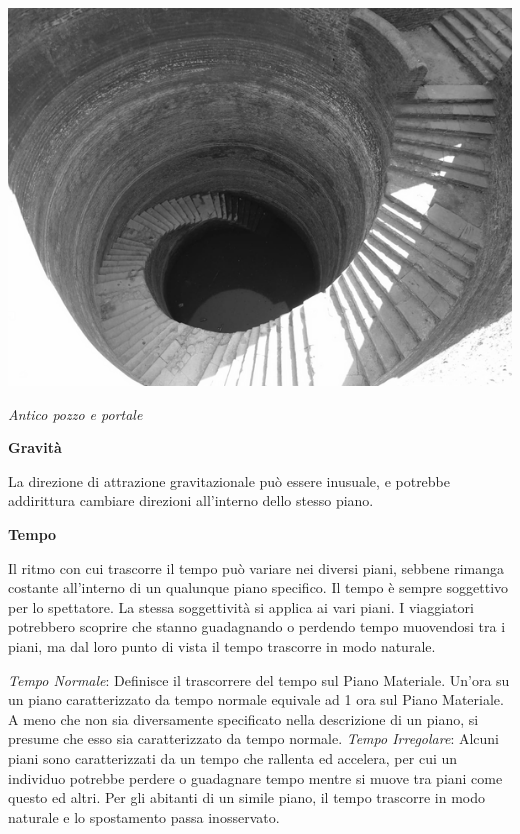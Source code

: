 \documentclass[a4paper,twoside,openany]{book}
\begin{document}
\begin{multicols}{2}
\begin{center}
	\includegraphics[width=0.9\linewidth]{immagini/ancientwell.png}
	
	\medskip
	
	\emph{Antico pozzo e portale}
\end{center}


\textbf{Gravità}

\medskip

La direzione di attrazione gravitazionale può essere inusuale, e potrebbe addirittura cambiare direzioni all'interno dello stesso piano.

\medskip

\textbf{Tempo}

\medskip

Il ritmo con cui trascorre il tempo può variare nei diversi piani, sebbene rimanga costante all'interno di un qualunque piano specifico. Il tempo è sempre soggettivo per lo spettatore. La stessa soggettività si applica ai vari piani. I viaggiatori potrebbero scoprire che stanno guadagnando o perdendo tempo muovendosi tra i piani, ma dal loro punto di vista il tempo trascorre in modo naturale.


\emph{Tempo Normale}: Definisce il trascorrere del tempo sul Piano Materiale. Un'ora su un piano caratterizzato da tempo normale equivale ad 1 ora sul Piano Materiale. A meno che non sia diversamente specificato nella descrizione di un piano, si presume che esso sia caratterizzato da tempo normale.
\emph{Tempo Irregolare}: Alcuni piani sono caratterizzati da un tempo che rallenta ed accelera, per cui un individuo potrebbe perdere o guadagnare tempo mentre si muove tra piani come questo ed altri. Per gli abitanti di un simile piano, il tempo trascorre in modo naturale e lo spostamento passa inosservato.



\end{multicols}
\end{document}

